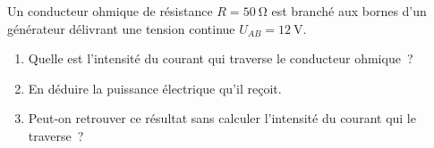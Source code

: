 Un conducteur ohmique de résistance
$R=\qty{50}{\ohm}$ est branché aux bornes d'un générateur délivrant une tension
continue $U_{AB}=\qty{12}{\volt}$.
\begin{enumerate}
    \item Quelle est l'intensité du courant qui traverse le conducteur ohmique~?
    \item En déduire la puissance électrique qu'il reçoit.
    \item Peut-on retrouver ce résultat sans calculer l'intensité du courant qui
        le traverse~?
\end{enumerate}

